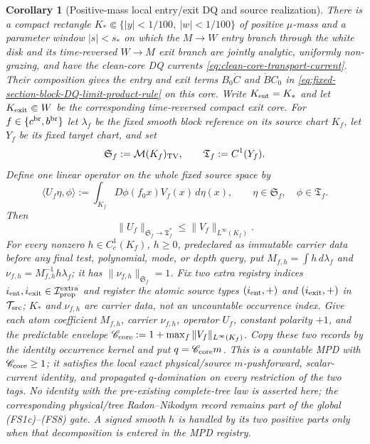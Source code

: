 \documentclass[11pt]{article}
\newtheorem{corollary}[theorem]{Corollary}
\begin{document}
\begin{corollary}[Positive-mass local entry/exit DQ and source realization]
\label{cor:fixed-section-local-block-DQ-realization}
There is a compact rectangle
$K_*\Subset\{|y|<1/100,\ |w|<1/100\}$ of positive $\mu$-mass and a parameter
window $|s|<s_*$ on which the $M\to W$ entry branch through the white disk
and its time-reversed $W\to M$ exit branch are jointly analytic, uniformly
non-grazing, and have the clean-core DQ currents
\eqref{eq:clean-core-transport-current}.  Their composition gives the
entry and exit terms $B_0\dot C$ and $\dot B C_0$ in
\eqref{eq:fixed-section-block-DQ-limit-product-rule} on this core.
Write $K_{\rm ent}=K_*$ and let $K_{\rm exit}\Subset W$ be the corresponding
time-reversed compact exit core.  For $f\in\{c^{\rm br},b^{\rm br}\}$ let
$\lambda_f$ be the fixed smooth block reference on its source chart
$K_f$, let $Y_f$ be its fixed target chart, and set
\begin{equation}
\label{eq:fixed-section-local-core-Banach-pair}
 \mathfrak S_f:=\mathcal M(K_f)_{\rm TV},
 \qquad \mathfrak T_f:=C^1(Y_f).
\end{equation}
Define one linear operator on the whole fixed source space by
\begin{equation}
\label{eq:fixed-section-local-core-source-operator}
 \langle U_f\eta,\phi\rangle
 :=\int_{K_f}D\phi(f_0x)V_f(x)\,d\eta(x),
 \qquad \eta\in\mathfrak S_f,\quad \phi\in\mathfrak T_f.
\end{equation}
Then
\begin{equation}
\label{eq:fixed-section-local-core-operator-bound}
 \|U_f\|_{\mathfrak S_f\to\mathfrak T_f^*}
 \le\|V_f\|_{L^\infty(K_f)}.
\end{equation}
For every nonzero $h\in C_c^1(K_f)$, $h\ge0$, predeclared as
immutable carrier data before any final test, polynomial, mode, or depth
query, put
$M_{f,h}=\int h\,d\lambda_f$ and
$\nu_{f,h}=M_{f,h}^{-1}h\lambda_f$; it has
$\|\nu_{f,h}\|_{\mathfrak S_f}=1$.
Fix two extra registry indices
$i_{\rm ent},i_{\rm exit}\in\mathcal I_{\rm prop}^{\rm extra}$ and register
the atomic source types $(i_{\rm ent},+)$ and $(i_{\rm exit},+)$ in
$\mathcal T_{\rm src}$; $K_*$ and
$\nu_{f,h}$ are carrier data, not an uncountable occurrence index.  Give each
atom coefficient $M_{f,h}$, carrier $\nu_{f,h}$, operator $U_f$, constant polarity
$+1$, and the predictable envelope
$\mathscr C_{\rm core}:=1+\max_f\|V_f\|_{L^\infty(K_f)}$.  Copy these two
records by the identity occurrence kernel and put $q=\mathscr C_{\rm core}m$.
This is a countable MPD with $\mathscr C_{\rm core}\ge1$; it satisfies the
local exact physical/source $m$-pushforward, scalar-current identity, and
propagated $q$-domination on every restriction of the two tags.  No identity
with the pre-existing complete-tree law is asserted here; the corresponding
physical/tree Radon--Nikodym record remains part of the global
\textup{(FS1c)}--\textup{(FS8)} gate.  A signed smooth $h$ is handled by its
two positive parts only when that decomposition is entered in the MPD
registry.


\end{corollary}
\end{document}
